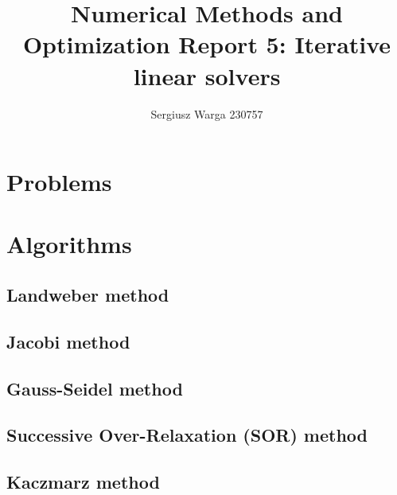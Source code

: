 \documentclass[a4paper]{article}
\title{Numerical Methods and Optimization Report 5:
Iterative linear solvers}
\author{Sergiusz Warga 230757}
\date{}
\begin{document}
\maketitle
\tableofcontents
\pagebreak

\section{Problems}



\clearpage

\section{Algorithms}
\label{sec:algorithms}

\subsection{Landweber method}%
\label{alg:landweber}


\subsection{Jacobi method}%
\label{alg:jacobi}


\subsection{Gauss-Seidel method}%
\label{alg:gauss-seidel}


\subsection{Successive Over-Relaxation (SOR) method}%
\label{slg:sor}


\subsection{Kaczmarz method}%
\label{slg:kaczmarz}


\clearpage

\nocite{Meyer, GoluVanl96, Zdunek}


\end{document}

